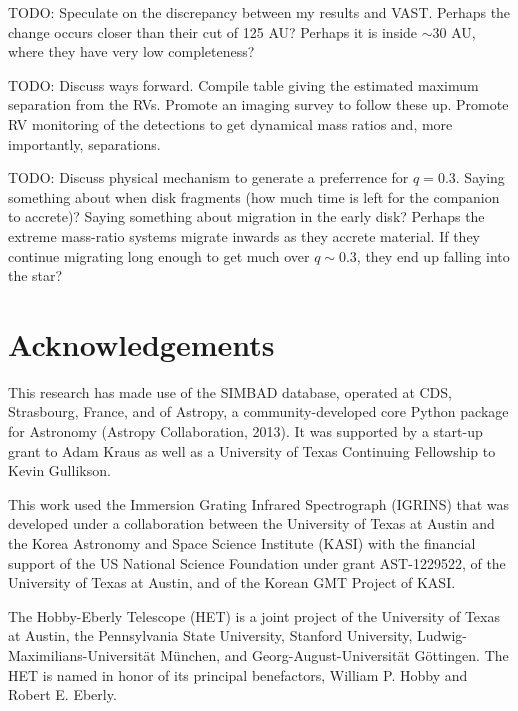 \documentclass{emulateapj}
\begin{document}
TODO: Speculate on the discrepancy between my results and VAST. Perhaps the change occurs closer than their cut of 125 AU? Perhaps it is inside $\sim 30$ AU, where they have very low completeness?

TODO: Discuss ways forward. Compile table giving the estimated maximum separation from the RVs. Promote an imaging survey to follow these up. Promote RV monitoring of the detections to get dynamical mass ratios and, more importantly, separations.

TODO: Discuss physical mechanism to generate a preferrence for $q = 0.3$. Saying something about when disk fragments (how much time is left for the companion to accrete)? Saying something about migration in the early disk? Perhaps the extreme mass-ratio systems migrate inwards as they accrete material. If they continue migrating long enough to get much over $q \sim 0.3$, they end up falling into the star?





\section*{Acknowledgements}
This research has made use of the SIMBAD database, operated at CDS, Strasbourg, France, and of Astropy, a community-developed core Python package for Astronomy (Astropy Collaboration, 2013).
It was supported by a start-up grant to Adam Kraus as well as a University of Texas Continuing Fellowship to Kevin Gullikson.

This work used the Immersion Grating Infrared Spectrograph (IGRINS) that was developed under a collaboration between the University of Texas at Austin and the Korea Astronomy and Space Science Institute (KASI) with the financial support of the US National Science Foundation under grant AST-1229522, of the University of Texas at Austin, and of the Korean GMT Project of KASI.

The Hobby-Eberly Telescope (HET) is a joint project of the University of Texas at Austin, the Pennsylvania State University, Stanford University, Ludwig-Maximilians-Universit\"at M\"unchen, and Georg-August-Universit\"at G\"ottingen. The HET is named in honor of its principal benefactors, William P. Hobby and Robert E. Eberly.
\end{document}
